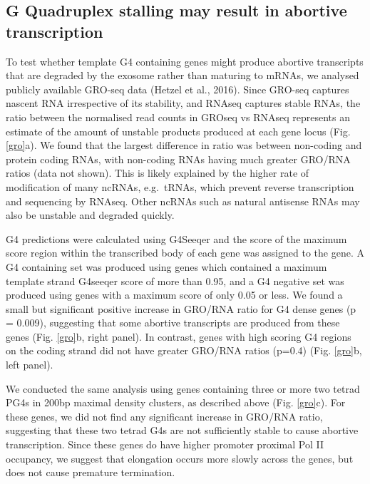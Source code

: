 \documentclass[12pt,a4paper,]{report}
\begin{document}
\newpage

\hypertarget{g-quadruplex-stalling-may-result-in-abortive-transcription}{%
\subsection{G Quadruplex stalling may result in abortive
transcription}\label{g-quadruplex-stalling-may-result-in-abortive-transcription}}

To test whether template G4 containing genes might produce abortive
transcripts that are degraded by the exosome rather than maturing to
mRNAs, we analysed publicly available GRO-seq data (Hetzel et al.,
2016). Since GRO-seq captures nascent RNA irrespective of its stability,
and RNAseq captures stable RNAs, the ratio between the normalised read
counts in GROseq vs RNAseq represents an estimate of the amount of
unstable products produced at each gene locus (Fig. \ref{gro}a). We
found that the largest difference in ratio was between non-coding and
protein coding RNAs, with non-coding RNAs having much greater GRO/RNA
ratios (data not shown). This is likely explained by the higher rate of
modification of many ncRNAs, e.g.~tRNAs, which prevent reverse
transcription and sequencing by RNAseq. Other ncRNAs such as natural
antisense RNAs may also be unstable and degraded quickly.

G4 predictions were calculated using G4Seeqer and the score of the
maximum score region within the transcribed body of each gene was
assigned to the gene. A G4 containing set was produced using genes which
contained a maximum template strand G4seeqer score of more than 0.95,
and a G4 negative set was produced using genes with a maximum score of
only 0.05 or less. We found a small but significant positive increase in
GRO/RNA ratio for G4 dense genes (p = 0.009), suggesting that some
abortive transcripts are produced from these genes (Fig. \ref{gro}b,
right panel). In contrast, genes with high scoring G4 regions on the
coding strand did not have greater GRO/RNA ratios (p=0.4) (Fig.
\ref{gro}b, left panel).

We conducted the same analysis using genes containing three or more two
tetrad PG4s in 200bp maximal density clusters, as described above (Fig.
\ref{gro}c). For these genes, we did not find any significant increase
in GRO/RNA ratio, suggesting that these two tetrad G4s are not
sufficiently stable to cause abortive transcription. Since these genes
do have higher promoter proximal Pol II occupancy, we suggest that
elongation occurs more slowly across the genes, but does not cause
premature termination.
\end{document}
